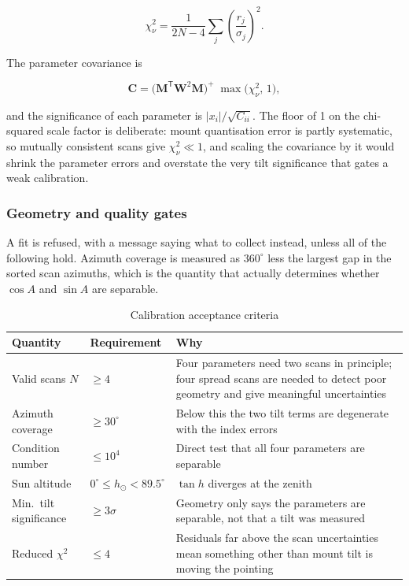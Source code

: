 \documentclass[11pt,a4paper]{article}
\begin{document}
\begin{equation}
\chi^2_\nu = \frac{1}{2N - 4}\sum_j \left(\frac{r_j}{\sigma_j}\right)^2 .
\end{equation}

The parameter covariance is

\begin{equation}
\mathbf{C} = \bigl(\mathbf{M}^\mathsf{T}\mathbf{W}^2\mathbf{M}\bigr)^{+}\;\max\bigl(\chi^2_\nu,\,1\bigr),
\end{equation}

and the significance of each parameter is $|x_i| / \sqrt{C_{ii}}$. The floor of 1 on the chi-squared scale factor is deliberate: mount quantisation error is partly systematic, so mutually consistent scans give $\chi^2_\nu \ll 1$, and scaling the covariance by it would shrink the parameter errors and overstate the very tilt significance that gates a weak calibration.

\subsubsection{Geometry and quality gates}

A fit is refused, with a message saying what to collect instead, unless all of the following hold. Azimuth coverage is measured as $360^\circ$ less the largest gap in the sorted scan azimuths, which is the quantity that actually determines whether $\cos A$ and $\sin A$ are separable.

\begin{table}[H]
\centering
\caption{Calibration acceptance criteria}
\label{tab:calgates}
\begin{tabular}{llp{7.2cm}}
\toprule
\textbf{Quantity} & \textbf{Requirement} & \textbf{Why} \\
\midrule
Valid scans $N$ & $\ge 4$ & Four parameters need two scans in principle; four spread scans are needed to detect poor geometry and give meaningful uncertainties \\
Azimuth coverage & $\ge 30^\circ$ & Below this the two tilt terms are degenerate with the index errors \\
Condition number & $\le 10^4$ & Direct test that all four parameters are separable \\
Sun altitude & $0^\circ \le h_\odot < 89.5^\circ$ & $\tan h$ diverges at the zenith \\
Min.\ tilt significance & $\ge 3\sigma$ & Geometry only says the parameters are separable, not that a tilt was measured \\
Reduced $\chi^2$ & $\le 4$ & Residuals far above the scan uncertainties mean something other than mount tilt is moving the pointing \\
\bottomrule
\end{tabular}
\end{table}
\end{document}
